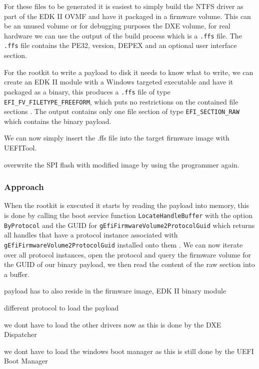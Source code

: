 For these files to be generated it is easiest to simply build the \ac{NTFS} driver as part of the \ac{EDK} II \ac{OVMF} and have it packaged in a firmware volume. This can be an unused volume or for debugging purposes the \ac{DXE} volume, for real hardware we can use the output of the build process which is a \lstinline{.ffs} file. The \lstinline{.ffs} file contains the \ac{PE32}, version, \ac{DEPEX} and an optional user interface section.

For the rootkit to write a payload to disk it needs to know what to write, we can create an \ac{EDK} II module with a Windows targeted executable and have it packaged as a binary, this produces a \lstinline{.ffs} file of type \lstinline{EFI_FV_FILETYPE_FREEFORM}, which puts no restrictions on the contained file sections \cite[Vol 3, 2.1.4.1.7]{pi-spec}. The output contains only one file section of type \lstinline{EFI_SECTION_RAW} which contains the binary payload.

We can now simply insert the .ffs file into the target firmware image with UEFITool.

overwrite the SPI flash with modified image by using the programmer again.

\subsubsection{Approach}

When the rootkit is executed it starts by reading the payload into memory, this is done by calling the boot service function \lstinline{LocateHandleBuffer} with the option \lstinline{ByProtocol} and the \ac{GUID} for \lstinline{gEfiFirmwareVolume2ProtocolGuid} which returns all handles that have a protocol instance associated with \lstinline{gEfiFirmwareVolume2ProtocolGuid} installed onto them \cite[7.3]{uefi-spec}. We can now iterate over all protocol instances, open the protocol and query the firmware volume for the \ac{GUID} of our binary payload, we then read the content of the raw section into a buffer. 

payload has to also reside in the firmware image, EDK II binary module

different protocol to load the payload

we dont have to load the other drivers now as this is done by the DXE Dispatcher

we dont have to load the windows boot manager as this is still done by the UEFI Boot Manager